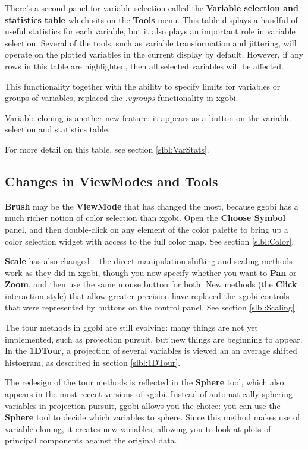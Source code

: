 \documentclass[11pt]{article}
\begin{document}
There's a second panel for variable selection called the {\bf
Variable selection and statistics table} which sits on the {\bf
Tools} menu.  This table displays a handful of useful statistics for
each variable, but it also plays an important role in variable
selection.  Several of the tools, such as variable transformation and
jittering, will operate on the plotted variables in the current
display by default.  However, if any rows in this table are highlighted,
then all selected variables will be affected. 

This functionality together with the ability to specify limits
for variables or groups of variables, replaced the {\em .vgroups}
functionality in xgobi.

Variable cloning is another new feature: it appears as a button
on the variable selection and statistics table.

For more detail on this table, see section \ref{slbl:VarStats}.

\subsection{Changes in ViewModes and Tools}

{\bf Brush} may be the {\bf ViewMode} that has changed the most,
because ggobi has a much richer notion of color selection than
xgobi.  Open the {\bf Choose Symbol} panel, and then double-click on
any element of the color palette to bring up a color selection widget
with access to the full color map.  See section \ref{slbl:Color}.

{\bf Scale} has also changed -- the direct manipulation shifting and
scaling methods work as they did in xgobi, though you now specify
whether you want to {\bf Pan} or {\bf Zoom}, and then use the same
mouse button for both.  New methods (the {\bf Click} interaction
style) that allow greater precision have replaced the xgobi controls
that were represented by buttons on the control panel.  See section
\ref{slbl:Scaling}.

The tour methods in ggobi are still evolving:  many things are not
yet implemented, such as projection pursuit, but new things are
beginning to appear.  In the {\bf 1DTour}, a projection of several
variables is viewed an an average shifted histogram, as described
in section \ref{slbl:1DTour}.

The redesign of the tour methods is reflected in the {\bf Sphere}
tool, which also appears in the most recent versions of xgobi.
Instead of automatically sphering variables in projection pursuit,
ggobi allows you the choice:  you can use the {\bf Sphere} tool to
decide which variables to sphere.  Since this method makes use of
variable cloning, it creates new variables, allowing you to look at
plots of principal components against the original data.
\end{document}
